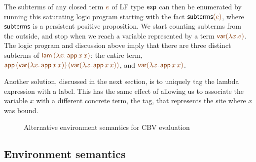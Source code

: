 The subterms of any closed term
$\lf{e}$ of LF type ${\sf exp}$ can then be enumerated by running this
saturating logic program starting with the fact ${\sf subterms}\lf{(e)}$,
where ${\sf subterms}$ is a persistent positive proposition.
We start counting subterms from the outside, and stop 
when we reach a variable represented by a term $\lf{{\sf
    var}(\lambda x.e)}$.  The logic program and discussion above imply
that there are three distinct subterms of $\lf{{\sf lam}\,(\lambda
  x.\,{\sf app}\,x\,x)}$: the entire term, $\lf{{\sf app}\,({\sf
    var}(\lambda x.\,{\sf app}\,x\,x))\,({\sf var}(\lambda x.\,{\sf
    app}\,x\,x))}$, and $\lf{{\sf var}(\lambda x.\,{\sf app}\,x\,x)}$.

Another solution, discussed in the next
section, is to uniquely tag the lambda expression with a label. This
has the same effect of allowing us to associate the variable $x$
with a different concrete term, the tag, that represents the site
where $x$ was bound.






\begin{figure}
\caption{Alternative environment semantics for CBV evaluation}
\label{fig:dest-env}
\end{figure}

\subsection{Environment semantics}


